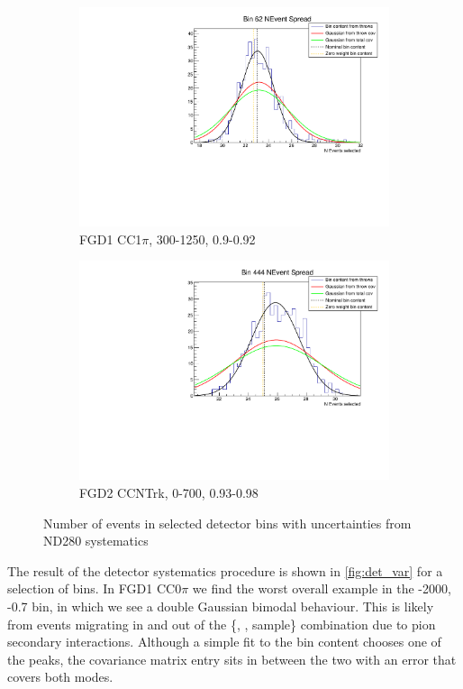 \begin{figure}[h]
	\begin{subfigure}[t]{0.42\textwidth}
		\includegraphics[width=\textwidth, trim={4mm 3mm 2mm 2mm}, clip,page=1]{figures/numu/syst/good_bin}
		\caption{FGD1 CC1$\pi$, 300-1250, 0.9-0.92}
	\end{subfigure}
	\begin{subfigure}[t]{0.42\textwidth}
		\includegraphics[width=\textwidth, trim={4mm 3mm 2mm 2mm}, clip,page=1]{figures/numu/syst/good_bin2}
		\caption{FGD2 CCNTrk, 0-700, 0.93-0.98}
	\end{subfigure}
	\caption{Number of events in selected detector bins with uncertainties from ND280 systematics}
	\label{fig:det_var}
\end{figure}
The result of the detector systematics procedure is shown in \autoref{fig:det_var} for a selection of bins. In FGD1 CC0$\pi$ we find the worst overall example in the -2000, -0.7 bin, in which we see a double Gaussian bimodal behaviour. This is likely from events migrating in and out of the \{\pmu, \cosmu, sample\} combination due to pion secondary interactions. Although a simple fit to the bin content chooses one of the peaks, the covariance matrix entry sits in between the two with an error that covers both modes.

